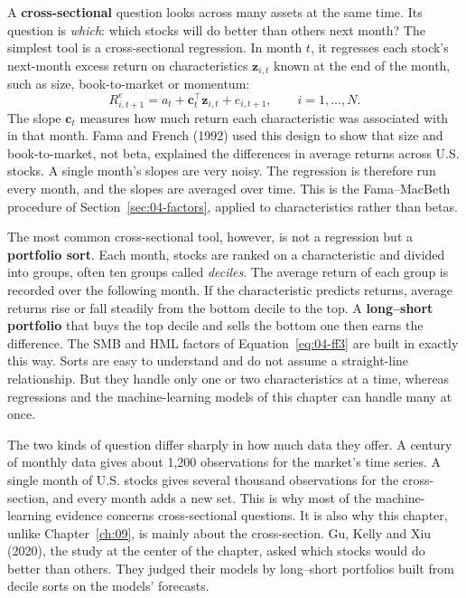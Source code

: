 A \textbf{cross-sectional} question looks across many assets at the same time. Its question is \emph{which}: which stocks will do better than others next month? The simplest tool is a cross-sectional regression. In month $t$, it regresses each stock's next-month excess return on characteristics $\mathbf{z}_{i,t}$ known at the end of the month, such as size, book-to-market or momentum:
\begin{equation}
  R^{e}_{i,t+1} = a_t + \mathbf{c}_t^{\top} \mathbf{z}_{i,t} + e_{i,t+1}, \qquad i = 1, \dots, N.
  \label{eq:20-xs}
\end{equation}
The slope $\mathbf{c}_t$ measures how much return each characteristic was associated with in that month. Fama and French (1992) used this design to show that size and book-to-market, not beta, explained the differences in average returns across U.S. stocks. A single month's slopes are very noisy. The regression is therefore run every month, and the slopes are averaged over time. This is the Fama--MacBeth procedure of Section~\ref{sec:04-factors}, applied to characteristics rather than betas.

The most common cross-sectional tool, however, is not a regression but a \textbf{portfolio sort}. Each month, stocks are ranked on a characteristic and divided into groups, often ten groups called \emph{deciles}. The average return of each group is recorded over the following month. If the characteristic predicts returns, average returns rise or fall steadily from the bottom decile to the top. A \textbf{long--short portfolio} that buys the top decile and sells the bottom one then earns the difference. The SMB and HML factors of Equation~\eqref{eq:04-ff3} are built in exactly this way. Sorts are easy to understand and do not assume a straight-line relationship. But they handle only one or two characteristics at a time, whereas regressions and the machine-learning models of this chapter can handle many at once.

The two kinds of question differ sharply in how much data they offer. A century of monthly data gives about 1,200 observations for the market's time series. A single month of U.S. stocks gives several thousand observations for the cross-section, and every month adds a new set. This is why most of the machine-learning evidence concerns cross-sectional questions. It is also why this chapter, unlike Chapter~\ref{ch:09}, is mainly about the cross-section. Gu, Kelly and Xiu (2020), the study at the center of the chapter, asked which stocks would do better than others. They judged their models by long--short portfolios built from decile sorts on the models' forecasts.

